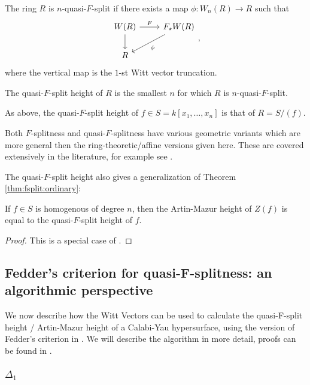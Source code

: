 \begin{defn}
	The ring \(R\) is \(n\)-quasi-\(F\)-split if there exists
	a map \(\phi \colon W_{n}(R) \xrightarrow{} R\) such that
	\[
	\begin{tikzcd}
		W(R) \arrow{r}{F} \arrow{d}[swap]{} &
		F_{\star}W(R) \arrow{ld}{\phi} \\
	R 
	\end{tikzcd}
	,\]
	where the vertical map is the \(1\)-st Witt vector truncation.

	The quasi-\(F\)-split height of \(R\) is the smallest \(n\) 
	for which \(R\) is \(n\)-quasi-\(F\)-split.

	As above, the quasi-\(F\)-split height of 
	\(f \in S = k[x_{1}, \ldots, x_{n}]\) is that
	of \(R = S / (f)\).
\end{defn}

\begin{rmk}
	Both \(F\)-splitness and quasi-\(F\)-splitness have 
	various geometric
	variants which are more general then the 
	ring-theoretic/affine versions given here. 
	These are covered extensively in the literature, for example
	see \cite{kttwyy-2022-qfs-birat}.
\end{rmk}

The quasi-\(F\)-split height also gives a generalization
of Theorem \ref{thm:fsplit:ordinary}:

\begin{thm}
	If \(f \in S\) is homogenous of degree \(n\),
	then the Artin-Mazur height of \(Z(f)\)
	is equal to the quasi-\(F\)-split height
	of \(f\).
\end{thm}

\begin{proof}
	This is a special case of 
	\cite[Theorem~4.5]{yobuko-2019-qfs-calabi-yau}.
\end{proof}

\subsection{Fedder's criterion for quasi-F-splitness: an algorithmic perspective}

We now describe how the Witt Vectors can be used to calculate the 
quasi-F-split height / Artin-Mazur height of a Calabi-Yau 
hypersurface, using the version of Fedder's criterion in \cite{kty-2022-fedder}.
We will describe the algorithm in more detail, proofs can be
found in \cite{kty-2022-fedder}.

\subsubsection{\(\Delta_{1}\)}

